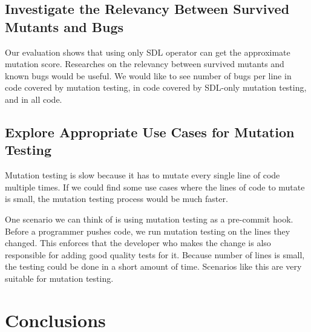 \documentclass[12pt]{article}
\begin{document}
\subsection{Investigate the Relevancy Between Survived Mutants and Bugs}

Our evaluation shows that using only SDL operator can get the approximate mutation score. Researches on the relevancy between survived mutants and known bugs would be useful. We would like to see number of bugs per line in code covered by mutation testing, in code covered by SDL-only mutation testing, and in all code.

\subsection{Explore Appropriate Use Cases for Mutation Testing}

Mutation testing is slow because it has to mutate every single line of code multiple times. If we could find some use cases where the lines of code to mutate is small, the mutation testing process would be much faster.

One scenario we can think of is using mutation testing as a pre-commit hook. Before a programmer pushes code, we run mutation testing on the lines they changed. This enforces that the developer who makes the change is also responsible for adding good quality tests for it. Because number of lines is small, the testing could be done in a short amount of time. Scenarios like this are very suitable for mutation testing.

\section{Conclusions}



\end{document}
